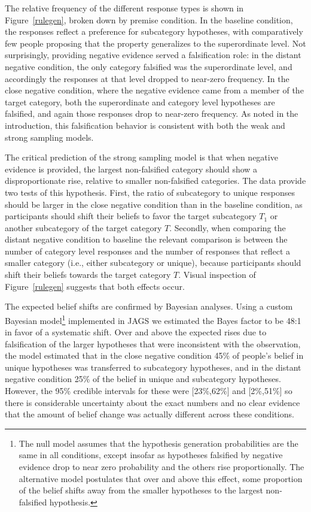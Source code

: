 \documentclass[authoryear,11pt]{elsarticle}
\begin{document}
The relative frequency of the different response types is shown in Figure~\ref{rulegen}, broken down by premise condition. In the {\sc baseline} condition, the responses reflect a preference for {\sc subcategory} hypotheses, with comparatively few people proposing that the property generalizes to the {\sc superordinate} level. Not surprisingly, providing negative evidence served a falsification role: in the {\sc distant negative} condition, the only category falsified was the {\sc superordinate} level, and accordingly the responses at that level dropped to near-zero frequency. In the {\sc close negative} condition, where the negative evidence came from a member of the target category, both the {\sc superordinate} and {\sc category} level hypotheses are falsified, and again those responses drop to near-zero frequency. As noted in the introduction, this falsification behavior is consistent with both the weak and strong sampling models.

The critical prediction of the strong sampling model is that when negative evidence is provided, the largest non-falsified category should show a disproportionate rise, relative to smaller non-falsified categories. The data provide two tests of this hypothesis. First, the ratio of {\sc subcategory} to {\sc unique} responses should be larger in the {\sc close negative} condition than in the {\sc baseline} condition, as participants should shift their beliefs to favor the target subcategory $T_1$ or another subcategory of the target category $T$. Secondly, when comparing the {\sc distant negative} condition to {\sc baseline} the relevant comparison is between the number of {\sc category} level responses and the number of responses that reflect a smaller category (i.e., either {\sc subcategory} or {\sc unique}), because participants should shift their beliefs towards the target category $T$. Visual inspection of Figure~\ref{rulegen} suggests that both effects occur.

The expected belief shifts are confirmed by Bayesian analyses. Using a custom Bayesian model\footnote{The null model assumes that the hypothesis generation probabilities are the same in all conditions, except insofar as hypotheses falsified by negative evidence drop to near zero probability and the others rise proportionally. The alternative model postulates that over and above this effect, some proportion of the belief shifts away from the smaller hypotheses to the largest non-falsified hypothesis.} implemented in JAGS we estimated the Bayes factor to be 48:1 in favor of a systematic shift. Over and above the expected rises due to falsification of the larger hypotheses that were inconsistent with the observation, the model estimated that in the {\sc close negative} condition 45\% of people's belief in {\sc unique} hypotheses was transferred to {\sc subcategory} hypotheses, and in the {\sc distant negative} condition 25\% of the belief in {\sc unique} and {\sc subcategory} hypotheses. However, the 95\% credible intervals for these were [23\%,62\%] and [2\%,51\%] so there is considerable uncertainty about the exact numbers and no clear evidence that the amount of belief change was actually different across these conditions.
\end{document}
